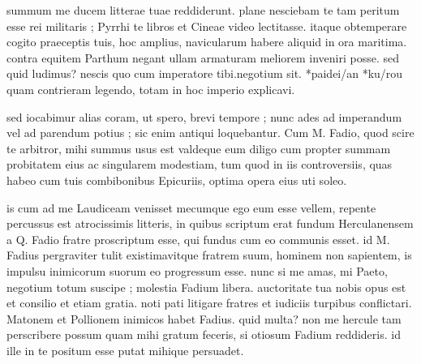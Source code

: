 


 summum me ducem litterae tuae reddiderunt. plane nesciebam te tam peritum esse rei militaris ; Pyrrhi te libros et Cineae video lectitasse. itaque obtemperare cogito praeceptis tuis, hoc amplius, navicularum habere aliquid in ora maritima. contra equitem Parthum negant ullam armaturam meliorem inveniri posse. sed quid ludimus? nescis quo cum imperatore tibi.negotium sit. *paidei/an *ku/rou quam contrieram legendo, totam in hoc imperio explicavi.

 sed iocabimur alias coram, ut spero, brevi tempore ; nunc ades ad imperandum vel ad parendum potius ; sic enim antiqui loquebantur. Cum M. Fadio, quod scire te arbitror, mihi summus usus est valdeque eum diligo cum propter summam probitatem eius ac singularem modestiam, tum quod in iis controversiis, quas habeo cum tuis combibonibus Epicuriis, optima opera eius uti soleo.

 is cum ad me Laudiceam venisset mecumque ego eum esse vellem, repente percussus est atrocissimis litteris, in quibus scriptum erat fundum Herculanensem a Q. Fadio fratre proscriptum esse, qui fundus cum eo communis esset. id M. Fadius pergraviter tulit existimavitque fratrem suum, hominem non sapientem, is impulsu inimicorum suorum eo progressum esse. nunc si me amas, mi Paeto, negotium totum suscipe ; molestia Fadium libera. auctoritate tua nobis opus est et consilio et etiam gratia. noti pati litigare fratres et iudiciis turpibus conflictari. Matonem et Pollionem inimicos habet Fadius. quid multa? non me hercule tam perscribere possum quam mihi gratum feceris, si otiosum Fadium reddideris. id ille in te positum esse putat mihique persuadet.
